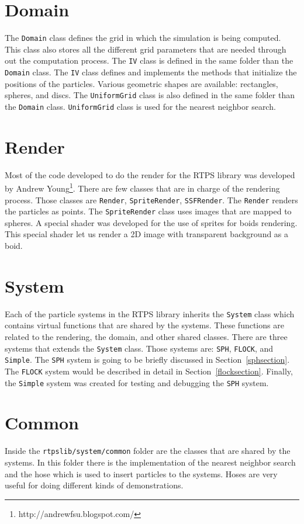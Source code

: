 \section{Domain}
The \texttt{Domain} class defines the grid in which the simulation is being computed. This class also stores all the different grid parameters that are needed through out the computation process. The \texttt{IV} class is defined in the same folder than the \texttt{Domain} class. The \texttt{IV} class defines and implements the methods that initialize the positions of the particles. Various geometric shapes are available: rectangles, spheres, and discs. The \texttt{UniformGrid} class is also defined in the same folder than the \texttt{Domain} class. \texttt{UniformGrid} class is used for the nearest neighbor search.

\section{Render}
Most of the code developed to do the render for the RTPS library was developed by Andrew Young\footnote{http://andrewfsu.blogspot.com/}. There are few classes that are in charge of the rendering process. Those classes are \texttt{Render}, \texttt{SpriteRender}, \texttt{SSFRender}. The \texttt{Render} renders the particles as points. The \texttt{SpriteRender} class uses images that are mapped to spheres. A special shader was developed for the use of sprites for boids rendering. This special shader let us render a 2D image with transparent background as a boid.

\section{System}
Each of the particle systems in the RTPS library inherits the \texttt{System} class which contains virtual functions that are shared by the systems. These functions are related to the rendering,  the domain, and other shared classes. There are three systems that extends the \texttt{System} class. Those systems are: \texttt{SPH}, \texttt{FLOCK}, and \texttt{Simple}. The \texttt{SPH} system is going to be briefly discussed in Section~\ref{sphsection}. The \texttt{FLOCK} system would be described in detail in Section~\ref{flocksection}. Finally, the \texttt{Simple} system was created for testing and debugging the \texttt{SPH} system.

\section{Common}\label{commonsection}
Inside the \texttt{rtpslib/system/common} folder are the classes that are shared by the systems. In this folder there is the implementation of the nearest neighbor search and the hose which is used to insert particles to the systems. Hoses are very useful for doing different kinds of demonstrations. 

